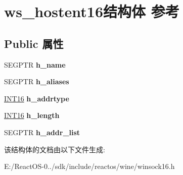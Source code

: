 \hypertarget{structws__hostent16}{}\section{ws\+\_\+hostent16结构体 参考}
\label{structws__hostent16}
\subsection*{Public 属性}
\begin{DoxyCompactItemize}
\item 
\mbox{\label{structws__hostent16_a8f82b450947bedf1eff3e8d2e48d8a26}} 
S\+E\+G\+P\+TR {\bfseries h\+\_\+name}
\item 
\mbox{\label{structws__hostent16_a6a01b3e355540477ba999b2ed00ff4d0}} 
S\+E\+G\+P\+TR {\bfseries h\+\_\+aliases}
\item 
\mbox{\label{structws__hostent16_ac116cad75507a6a7fa132ed12de70859}} 
\hyperlink{_processor_bind_8h_a30f500129d8c688af07726d5d34ce52d}{I\+N\+T16} {\bfseries h\+\_\+addrtype}
\item 
\mbox{\label{structws__hostent16_ac4ece84f371a4ad3c5071bf0a3535f7d}} 
\hyperlink{_processor_bind_8h_a30f500129d8c688af07726d5d34ce52d}{I\+N\+T16} {\bfseries h\+\_\+length}
\item 
\mbox{\label{structws__hostent16_a7133b6adbafa0403c82c5042d7ac818d}} 
S\+E\+G\+P\+TR {\bfseries h\+\_\+addr\+\_\+list}
\end{DoxyCompactItemize}


该结构体的文档由以下文件生成\+:\begin{DoxyCompactItemize}
\item 
E\+:/\+React\+O\+S-\/0../sdk/include/reactos/wine/winsock16.\+h\end{DoxyCompactItemize}
